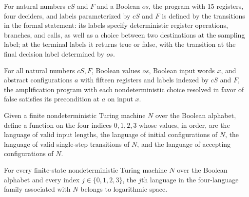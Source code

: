 \begin{definition}
\label{Randomized.PolyAmp.ampA}
\leanok
{}
For natural numbers $cS$ and $F$ and a Boolean $os$, the program with 15 registers, four
deciders, and labels parameterized by $cS$ and $F$ is defined by the transitions in the
formal statement: its labels specify deterministic register operations, branches, and
calls, as well as a choice between two destinations at the sampling label; at the
terminal labels it returns true or false, with the transition at the final decision
label determined by $os$.
\end{definition}

\begin{lemma}
\label{Randomized.PolyAmp.ampA_npreS}
\leanok
{}
For all natural numbers $cS,F$, Boolean values $os$, Boolean input words $x$, and
abstract configurations $a$ with fifteen registers and labels indexed by $cS$ and $F$,
the amplification program with each nondeterministic choice resolved in favor of false
satisfies its precondition at $a$ on input $x$.
\end{lemma}

\begin{definition}
\label{Randomized.PolyAmp.ampAs}
\leanok
{}
Given a finite nondeterministic Turing machine $N$ over the Boolean alphabet, define a
function on the four indices $0,1,2,3$ whose values, in order, are the language of valid
input lengths, the language of initial configurations of $N$, the language of valid
single-step transitions of $N$, and the language of accepting configurations of $N$.
\end{definition}

\begin{theorem}
\label{Randomized.PolyAmp.ampAs_mem}
\leanok
{}
For every finite-state nondeterministic Turing machine $N$ over the Boolean alphabet and
every index $j\in\{0,1,2,3\}$, the $j$th language in the four-language family associated
with $N$ belongs to logarithmic space.
\end{theorem}

